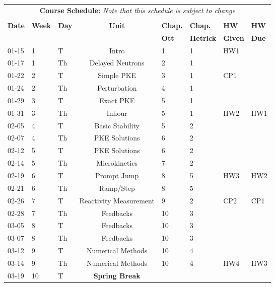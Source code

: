 \documentclass[11pt]{article}
\begin{document}
\pagebreak
\FloatBarrier
\renewcommand{\arraystretch}{1}
\begin{table}[h]
\begin{center}
\begin{tabular}{lllcllll}
\multicolumn{8}{c}{\textbf{Course Schedule:}\textit{ Note that this schedule is subject to change}}\\
&&&&&&&\\
\textbf{Date} & \textbf{Week} & \textbf{Day} & \textbf{Unit} & \textbf{Chap.} & \textbf{Chap.} & \textbf{HW} & \textbf{HW}\\
              &  &  & & \textbf{Ott}& \textbf{Hetrick} & \textbf{Given} & \textbf{Due}\\
\hline
\hline
01-15 & 1 & T  & Intro                  & 1  & 1 & HW1  & \\
01-17 & 1 & Th & Delayed Neutrons       & 2  & 1 &      & \\
01-22 & 2 & T  & Simple PKE             & 3  & 1 & CP1  & \\
01-24 & 2 & Th & Perturbation           & 4  & 1 &      & \\
01-29 & 3 & T  & Exact PKE              & 5  & 1 &      & \\
01-31 & 3 & Th & Inhour                 & 5  & 1 & HW2  & HW1\\
02-05 & 4 & T  & Basic Stability        & 5  & 2 &      & \\
02-07 & 4 & Th & PKE Solutions          & 6  & 2 &      & \\
02-12 & 5 & T  & PKE Solutions          & 6  & 2 &      & \\
02-14 & 5 & Th & Microkinetics          & 7  & 2 &      & \\
02-19 & 6 & T  & Prompt Jump            & 8  & 5 & HW3  & HW2\\
02-21 & 6 & Th & Ramp/Step              & 8  & 5 &      & \\
02-26 & 7 & T  & Reactivity Measurement & 9  & 2 & CP2  & CP1\\
02-28 & 7 & Th & Feedbacks              & 10 & 3 &      & \\
03-05 & 8 & T  & Feedbacks              & 10 & 3 &      & \\
03-07 & 8 & Th & Feedbacks              & 10 & 3 &      & \\
03-12 & 9 & T  & Numerical Methods      & 10 & 4 &      & \\
03-14 & 9 & Th & Numerical Methods      & 10 & 4 & HW4  & HW3\\
03-19 & 10 & T  & \textbf{Spring Break} &    &   &      & \\

\end{tabular}
\end{center}
\end{table}
\end{document}
